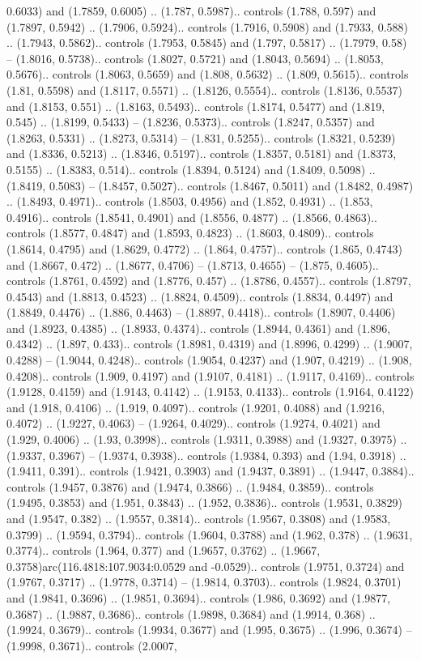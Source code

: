 0.6033) and (1.7859, 0.6005) .. (1.787, 0.5987).. controls (1.788, 0.597) and (1.7897, 0.5942) .. (1.7906, 0.5924).. controls (1.7916, 0.5908) and (1.7933, 0.588) .. (1.7943, 0.5862).. controls (1.7953, 0.5845) and (1.797, 0.5817) .. (1.7979, 0.58) -- (1.8016, 0.5738).. controls (1.8027, 0.5721) and (1.8043, 0.5694) .. (1.8053, 0.5676).. controls (1.8063, 0.5659) and (1.808, 0.5632) .. (1.809, 0.5615).. controls (1.81, 0.5598) and (1.8117, 0.5571) .. (1.8126, 0.5554).. controls (1.8136, 0.5537) and (1.8153, 0.551) .. (1.8163, 0.5493).. controls (1.8174, 0.5477) and (1.819, 0.545) .. (1.8199, 0.5433) -- (1.8236, 0.5373).. controls (1.8247, 0.5357) and (1.8263, 0.5331) .. (1.8273, 0.5314) -- (1.831, 0.5255).. controls (1.8321, 0.5239) and (1.8336, 0.5213) .. (1.8346, 0.5197).. controls (1.8357, 0.5181) and (1.8373, 0.5155) .. (1.8383, 0.514).. controls (1.8394, 0.5124) and (1.8409, 0.5098) .. (1.8419, 0.5083) -- (1.8457, 0.5027).. controls (1.8467, 0.5011) and (1.8482, 0.4987) .. (1.8493, 0.4971).. controls (1.8503, 0.4956) and (1.852, 0.4931) .. (1.853, 0.4916).. controls (1.8541, 0.4901) and (1.8556, 0.4877) .. (1.8566, 0.4863).. controls (1.8577, 0.4847) and (1.8593, 0.4823) .. (1.8603, 0.4809).. controls (1.8614, 0.4795) and (1.8629, 0.4772) .. (1.864, 0.4757).. controls (1.865, 0.4743) and (1.8667, 0.472) .. (1.8677, 0.4706) -- (1.8713, 0.4655) -- (1.875, 0.4605).. controls (1.8761, 0.4592) and (1.8776, 0.457) .. (1.8786, 0.4557).. controls (1.8797, 0.4543) and (1.8813, 0.4523) .. (1.8824, 0.4509).. controls (1.8834, 0.4497) and (1.8849, 0.4476) .. (1.886, 0.4463) -- (1.8897, 0.4418).. controls (1.8907, 0.4406) and (1.8923, 0.4385) .. (1.8933, 0.4374).. controls (1.8944, 0.4361) and (1.896, 0.4342) .. (1.897, 0.433).. controls (1.8981, 0.4319) and (1.8996, 0.4299) .. (1.9007, 0.4288) -- (1.9044, 0.4248).. controls (1.9054, 0.4237) and (1.907, 0.4219) .. (1.908, 0.4208).. controls (1.909, 0.4197) and (1.9107, 0.4181) .. (1.9117, 0.4169).. controls (1.9128, 0.4159) and (1.9143, 0.4142) .. (1.9153, 0.4133).. controls (1.9164, 0.4122) and (1.918, 0.4106) .. (1.919, 0.4097).. controls (1.9201, 0.4088) and (1.9216, 0.4072) .. (1.9227, 0.4063) -- (1.9264, 0.4029).. controls (1.9274, 0.4021) and (1.929, 0.4006) .. (1.93, 0.3998).. controls (1.9311, 0.3988) and (1.9327, 0.3975) .. (1.9337, 0.3967) -- (1.9374, 0.3938).. controls (1.9384, 0.393) and (1.94, 0.3918) .. (1.9411, 0.391).. controls (1.9421, 0.3903) and (1.9437, 0.3891) .. (1.9447, 0.3884).. controls (1.9457, 0.3876) and (1.9474, 0.3866) .. (1.9484, 0.3859).. controls (1.9495, 0.3853) and (1.951, 0.3843) .. (1.952, 0.3836).. controls (1.9531, 0.3829) and (1.9547, 0.382) .. (1.9557, 0.3814).. controls (1.9567, 0.3808) and (1.9583, 0.3799) .. (1.9594, 0.3794).. controls (1.9604, 0.3788) and (1.962, 0.378) .. (1.9631, 0.3774).. controls (1.964, 0.377) and (1.9657, 0.3762) .. (1.9667, 0.3758)arc(116.4818:107.9034:0.0529 and -0.0529).. controls (1.9751, 0.3724) and (1.9767, 0.3717) .. (1.9778, 0.3714) -- (1.9814, 0.3703).. controls (1.9824, 0.3701) and (1.9841, 0.3696) .. (1.9851, 0.3694).. controls (1.986, 0.3692) and (1.9877, 0.3687) .. (1.9887, 0.3686).. controls (1.9898, 0.3684) and (1.9914, 0.368) .. (1.9924, 0.3679).. controls (1.9934, 0.3677) and (1.995, 0.3675) .. (1.996, 0.3674) -- (1.9998, 0.3671).. controls (2.0007, 